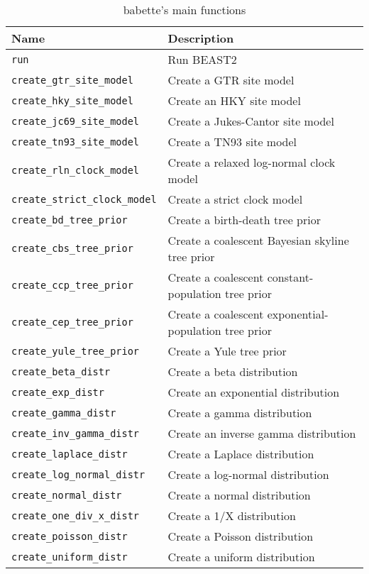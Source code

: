 \documentclass{article}
\begin{document}
\begin{table}[h]
\centering
\begin{tabular}{ | l | l | }
\hline
\textbf{Name} & \textbf{Description} \\
\hline
\verb;run; & Run BEAST2 \\
\hline
\verb;create_gtr_site_model; & Create a GTR site model \\
\verb;create_hky_site_model; & Create an HKY site model \\
\verb;create_jc69_site_model; & Create a Jukes-Cantor site model \\
\verb;create_tn93_site_model; & Create a TN93 site model \\
\hline
\verb;create_rln_clock_model; & Create a relaxed log-normal clock model \\
\verb;create_strict_clock_model; & Create a strict clock model \\
\hline
\verb;create_bd_tree_prior; & Create a birth-death tree prior \\
\verb;create_cbs_tree_prior; & Create a coalescent Bayesian skyline tree prior \\
\verb;create_ccp_tree_prior; & Create a coalescent constant-population tree prior \\
\verb;create_cep_tree_prior; & Create a coalescent exponential-population tree prior \\
\verb;create_yule_tree_prior; & Create a Yule tree prior \\
\hline
\verb;create_beta_distr; & Create a beta distribution \\
\verb;create_exp_distr; & Create an exponential distribution \\
\verb;create_gamma_distr; & Create a gamma distribution \\
\verb;create_inv_gamma_distr; & Create an inverse gamma distribution \\
\verb;create_laplace_distr; & Create a Laplace distribution \\
\verb;create_log_normal_distr; & Create a log-normal distribution \\
\verb;create_normal_distr; & Create a normal distribution \\
\verb;create_one_div_x_distr; & Create a 1/X distribution \\
\verb;create_poisson_distr; & Create a Poisson distribution \\
\verb;create_uniform_distr; & Create a uniform distribution \\
\hline
\end{tabular}
\caption{babette's main functions}
\label{tab:functions}
\end{table}
\end{document}
